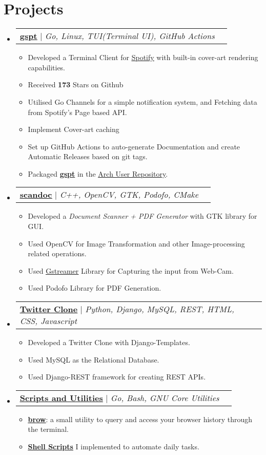 \documentclass[letterpaper,11pt]{article}
\makeatletter
\newcommand{\resumeItem}[1]{
  \item\small{
    {#1 \vspace{-2pt}}
  }
}
\newcommand{\resumeProjectHeading}[2]{
    \item
    \begin{tabular*}{0.97\textwidth}{l@{\extracolsep{\fill}}r}
      \small#1 & #2 \\
    \end{tabular*}\vspace{-7pt}
}
\newcommand{\resumeSubHeadingListStart}{\begin{itemize}[leftmargin=0.15in, label={}]}
\newcommand{\resumeSubHeadingListEnd}{\end{itemize}}
\newcommand{\resumeItemListStart}{\begin{itemize}}
\newcommand{\resumeItemListEnd}{\end{itemize}\vspace{-5pt}}
\makeatother
\begin{document}
\section{Projects}
    \resumeSubHeadingListStart
      \resumeProjectHeading
          {\textbf{\href{https://github.com/aditya-K2/gspt}{\underline{gspt}}} $|$ \emph{Go, Linux, TUI(Terminal UI), GitHub Actions}}{}
          \resumeItemListStart
            \resumeItem{Developed a Terminal Client for \href{https://www.spotify.com/}{\underline{Spotify}} with built-in cover-art rendering capabilities.}
            \resumeItem{Received \textbf{173} Stars on Github}
            \resumeItem{Utilised Go Channels for a simple notification system, and Fetching data from Spotify's Page based API.}
            \resumeItem{Implement Cover-art caching}
            \resumeItem{Set up GitHub Actions to auto-generate Documentation and create Automatic Releases based on git tags.}
            \resumeItem{Packaged \href{https://github.com/aditya-K2/gspt}{\textbf{gspt}} in the \href{https://aur.archlinux.org/packages/gspt-git}{\underline{Arch User Repository}}.}
          \resumeItemListEnd
      \resumeProjectHeading
          {\textbf{\href{https://github.com/aditya-K2/scandoc}{\underline{scandoc}}} $|$ \emph{C++, OpenCV, GTK, Podofo, CMake}}{}
          \resumeItemListStart
            \resumeItem{Developed a \textit{Document Scanner + PDF Generator} with GTK library for GUI.}
            \resumeItem{Used OpenCV for Image Transformation and other Image-processing related operations.}
            \resumeItem{Used \href{https://gstreamer.freedesktop.org/}{\underline{Gstreamer}} Library for Capturing the input from Web-Cam.}
            \resumeItem{Used Podofo Library for PDF Generation.}
          \resumeItemListEnd
      \resumeProjectHeading
          {\textbf{\href{https://github.com/aditya-K2/twitterclone}{\underline{Twitter Clone}}} $|$ \emph{Python, Django, MySQL, REST, HTML, CSS, Javascript}}{}
          \resumeItemListStart
            \resumeItem{Developed a Twitter Clone with Django-Templates. }
            \resumeItem{Used MySQL as the Relational Database.}
            \resumeItem{Used Django-REST framework for creating REST APIs.}
          \resumeItemListEnd
      \resumeProjectHeading
          {\textbf{\href{https://aditya-k2.github.io/utils.html}{\underline{Scripts and Utilities}}} $|$ \emph{Go, Bash, GNU Core Utilities}}{}
          \resumeItemListStart
            \resumeItem{\href{https://github.com/aditya-K2/brow}{\underline{\textbf{brow}}}: a small utility to query and access your browser history through the terminal.}
            \resumeItem{\href{https://github.com/aditya-K2/dot/tree/master/scripts/scripts}{\underline{\textbf {Shell Scripts}}} I implemented to automate daily tasks.}
          \resumeItemListEnd
    \resumeSubHeadingListEnd
\end{document}
